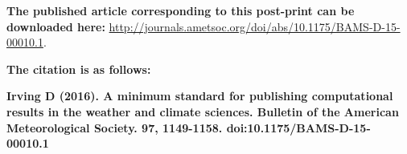 \textbf{The published article corresponding to this post-print can be downloaded here:}
\url{http://journals.ametsoc.org/doi/abs/10.1175/BAMS-D-15-00010.1}. 

\textbf{The citation is as follows:}    

\textbf{Irving D (2016). A minimum standard for publishing computational results in the weather and climate sciences. Bulletin of the American Meteorological Society. 97, 1149-1158. doi:10.1175/BAMS-D-15-00010.1}